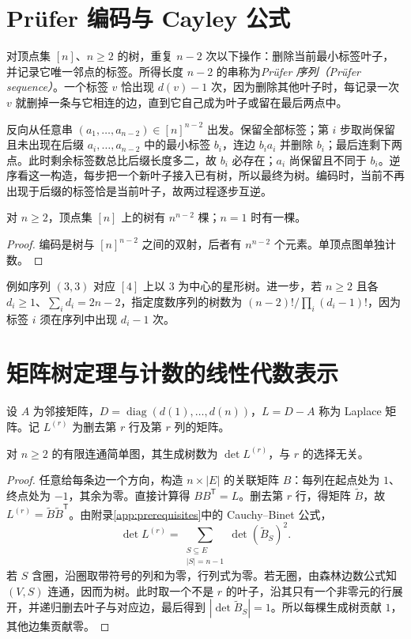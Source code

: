 \section{Pr\"ufer 编码与 Cayley 公式}

对顶点集 $[n]$、$n\ge2$ 的树，重复 $n-2$ 次以下操作：删除当前最小标签叶子，并记录它唯一邻点的标签。所得长度 $n-2$ 的串称为\emph{Pr\"ufer 序列（Pr\"ufer sequence）}。一个标签 $v$ 恰出现 $d(v)-1$ 次，因为删除其他叶子时，每记录一次 $v$ 就删掉一条与它相连的边，直到它自己成为叶子或留在最后两点中。

反向从任意串 $(a_1,\ldots,a_{n-2})\in[n]^{n-2}$ 出发。保留全部标签；第 $i$ 步取尚保留且未出现在后缀 $a_i,\ldots,a_{n-2}$ 中的最小标签 $b_i$，连边 $b_ia_i$ 并删除 $b_i$；最后连剩下两点。此时剩余标签数总比后缀长度多二，故 $b_i$ 必存在；$a_i$ 尚保留且不同于 $b_i$。逆序看这一构造，每步把一个新叶子接入已有树，所以最终为树。编码时，当前不再出现于后缀的标签恰是当前叶子，故两过程逐步互逆。

\begin{theorem}[Cayley 公式]
对 $n\ge2$，顶点集 $[n]$ 上的树有 $n^{n-2}$ 棵；$n=1$ 时有一棵。
\end{theorem}
\begin{proof}
编码是树与 $[n]^{n-2}$ 之间的双射，后者有 $n^{n-2}$ 个元素。单顶点图单独计数。
\end{proof}

例如序列 $(3,3)$ 对应 $[4]$ 上以 $3$ 为中心的星形树。进一步，若 $n\ge2$ 且各 $d_i\ge1$、$\sum_i d_i=2n-2$，指定度数序列的树数为 $(n-2)!/\prod_i(d_i-1)!$，因为标签 $i$ 须在序列中出现 $d_i-1$ 次。

\section{矩阵树定理与计数的线性代数表示}

设 $A$ 为邻接矩阵，$D=\operatorname{diag}(d(1),\ldots,d(n))$，$L=D-A$ 称为 Laplace 矩阵。记 $L^{(r)}$ 为删去第 $r$ 行及第 $r$ 列的矩阵。

\begin{theorem}
对 $n\ge2$ 的有限连通简单图，其生成树数为 $\det L^{(r)}$，与 $r$ 的选择无关。
\end{theorem}
\begin{proof}
任意给每条边一个方向，构造 $n\times |E|$ 的关联矩阵 $B$：每列在起点处为 $1$、终点处为 $-1$，其余为零。直接计算得 $BB^{\mathsf T}=L$。删去第 $r$ 行，得矩阵 $\widetilde B$，故 $L^{(r)}=\widetilde B\widetilde B^{\mathsf T}$。由附录\ref{app:prerequisites}中的 Cauchy--Binet 公式，
\[
 \det L^{(r)}=\sum_{\substack{S\subseteq E\\|S|=n-1}}
                 \det(\widetilde B_S)^2.
\]
若 $S$ 含圈，沿圈取带符号的列和为零，行列式为零。若无圈，由森林边数公式知 $(V,S)$ 连通，因而为树。此时取一个不是 $r$ 的叶子，沿其只有一个非零元的行展开，并递归删去叶子与对应边，最后得到 $|\det\widetilde B_S|=1$。所以每棵生成树贡献 $1$，其他边集贡献零。
\end{proof}

